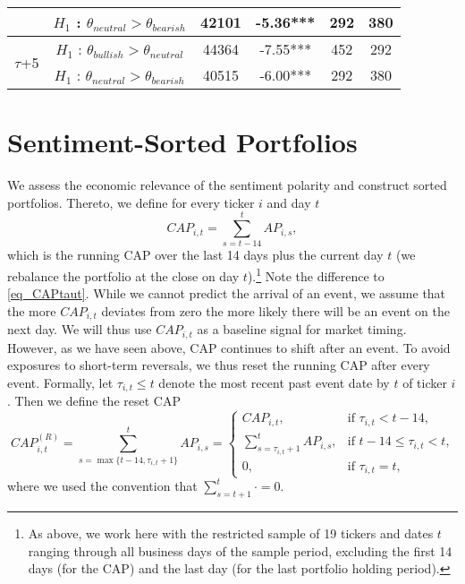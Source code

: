 \begin{table}
\begin{tabular}{|c|c|c|c|c|c|}
                                           & $H_1$ : $\theta_{neutral} > \theta_{bearish}$  & 42101 & -5.36*** & 292  & 380  \\ \hline
\multirow{2}{*}{$\tau$+5}                       & $H_1$ : $\theta_{bullish} > \theta_{neutral}$ & 44364 & -7.55*** & 452  & 292  \\
                                           & $H_1$ : $\theta_{neutral} > \theta_{bearish}$  & 40515 & -6.00*** & 292  & 380  \\ \hline
\end{tabular}
\label{utest_res}
\end{table}

\clearpage\section{Sentiment-Sorted Portfolios} \label{S:portfolios}

We assess the economic relevance of the sentiment polarity and construct sorted portfolios. Thereto, we define for every ticker $i$ and day $t$ 
\begin{equation}
     CAP_{i,t}=\sum_{s=t-14}^t AP_{i,s},
\end{equation}
which is the running CAP over the last 14 days plus the current day $t$ (we rebalance the portfolio at the close on day $t$).\footnote{As above, we work here with the restricted sample of 19 tickers and dates $t$ ranging through all business days of the sample period, excluding the first 14 days (for the CAP) and the last day (for the last portfolio holding period).} Note the difference to \eqref{eq_CAPtaut}. While we cannot predict the arrival of an event, we assume that the more $CAP_{i,t}$ deviates from zero the more likely there will be an event on the next day. We will thus use $CAP_{i,t}$ as a baseline signal for market timing. However, as we have seen above, CAP continues to shift after an event. To avoid exposures to short-term reversals, we thus reset the running CAP after every event. Formally, let $\tau_{i,t}\le t$ denote the most recent past event date by $t$ of ticker $i$. Then we define the reset CAP
\begin{equation}
    CAP_{i,t}^{(R)} = \sum_{s=\max\{t-14,\tau_{i,t}+1\}}^t AP_{i,s} = \begin{cases} CAP_{i,t},&\text{if $\tau_{i,t}<t-14$,} \\ \sum_{s= \tau_{i,t}+1}^t AP_{i,s},&\text{if $t-14\le \tau_{i,t}<t$,}\\
0,&\text{if $\tau_{i,t}=t$,}\end{cases}
\end{equation}
where we used the convention that $\sum_{s=t+1}^t \cdot =0$.

